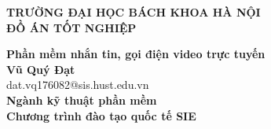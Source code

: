 \documentclass[DoAn.tex]{subfiles}
\begin{document}
\begin{titlepage}
\thispagestyle{empty}
\begin{center}

{\textbf{\large{TRƯỜNG ĐẠI HỌC BÁCH KHOA HÀ NỘI}}}\\[4cm]

{\textbf{\huge{ĐỒ ÁN TỐT NGHIỆP}}}\\[1cm]
{\textbf{\Large{Phần mềm nhắn tin, gọi điện video trực tuyến}}\\[1cm]

{\textbf{\large{Vũ Quý Đạt}}}\\
{\large{dat.vq176082@sis.hust.edu.vn}}\\[0.5cm]

{\textbf{\large{Ngành kỹ thuật phần mềm}}}\\
{\textbf{\large{Chương trình đào tạo quốc tế SIE}}}\\

\vspace{2cm}
\begin{table}[H]
\centering
{}
\end{table}}
\end{center}



\end{titlepage}
\end{document}
